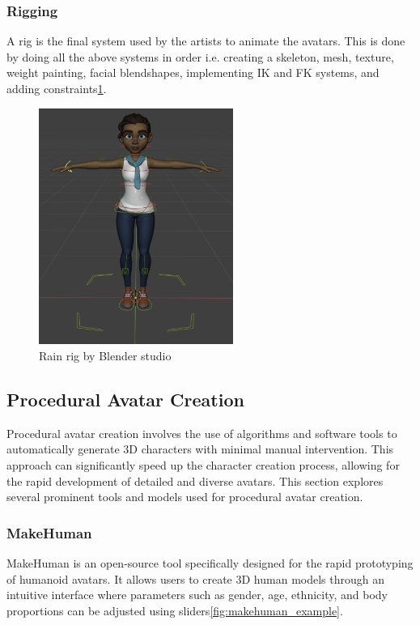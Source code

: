 \documentclass[../../main.tex]{subfiles}
\begin{document}
\subsubsection{Rigging}

A rig is the final system used by the artists to animate the avatars. This is done by doing all the above systems in order i.e. creating a skeleton, mesh, texture, weight painting, facial blendshapes, implementing IK and FK systems, and adding constraints\ref{fig:rig_example}.

\begin{figure}
  \centering \includegraphics[width = 2.5in]{chapters/background_work/images/rig_example.png}
  \caption{Rain rig by Blender studio}
  \label{fig:rig_example}
\end{figure}

\subsection{Procedural Avatar Creation}

Procedural avatar creation involves the use of algorithms and software tools to automatically generate 3D characters with minimal manual intervention. This approach can significantly speed up the character creation process, allowing for the rapid development of detailed and diverse avatars. This section explores several prominent tools and models used for procedural avatar creation.

\subsubsection{MakeHuman}

MakeHuman is an open-source tool specifically designed for the rapid prototyping of humanoid avatars. It allows users to create 3D human models through an intuitive interface where parameters such as gender, age, ethnicity, and body proportions can be adjusted using sliders\ref{fig:makehuman_example}.
\end{document}
